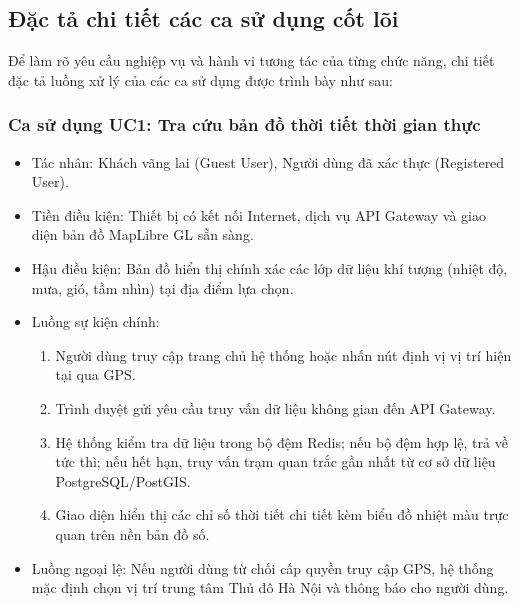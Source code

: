 \subsection{Đặc tả chi tiết các ca sử dụng cốt lõi}
Để làm rõ yêu cầu nghiệp vụ và hành vi tương tác của từng chức năng, chi tiết đặc tả luồng xử lý của các ca sử dụng được trình bày như sau:

\subsubsection{Ca sử dụng UC1: Tra cứu bản đồ thời tiết thời gian thực}
\begin{itemize}
    \item Tác nhân: Khách vãng lai (Guest User), Người dùng đã xác thực (Registered User).
    \item Tiền điều kiện: Thiết bị có kết nối Internet, dịch vụ API Gateway và giao diện bản đồ MapLibre GL sẵn sàng.
    \item Hậu điều kiện: Bản đồ hiển thị chính xác các lớp dữ liệu khí tượng (nhiệt độ, mưa, gió, tầm nhìn) tại địa điểm lựa chọn.
    \item Luồng sự kiện chính:
    \begin{enumerate}
        \item Người dùng truy cập trang chủ hệ thống hoặc nhấn nút định vị vị trí hiện tại qua GPS.
        \item Trình duyệt gửi yêu cầu truy vấn dữ liệu không gian đến API Gateway.
        \item Hệ thống kiểm tra dữ liệu trong bộ đệm Redis; nếu bộ đệm hợp lệ, trả về tức thì; nếu hết hạn, truy vấn trạm quan trắc gần nhất từ cơ sở dữ liệu PostgreSQL/PostGIS.
        \item Giao diện hiển thị các chỉ số thời tiết chi tiết kèm biểu đồ nhiệt màu trực quan trên nền bản đồ số.
    \end{enumerate}
    \item Luồng ngoại lệ: Nếu người dùng từ chối cấp quyền truy cập GPS, hệ thống mặc định chọn vị trí trung tâm Thủ đô Hà Nội và thông báo cho người dùng.
\end{itemize}


